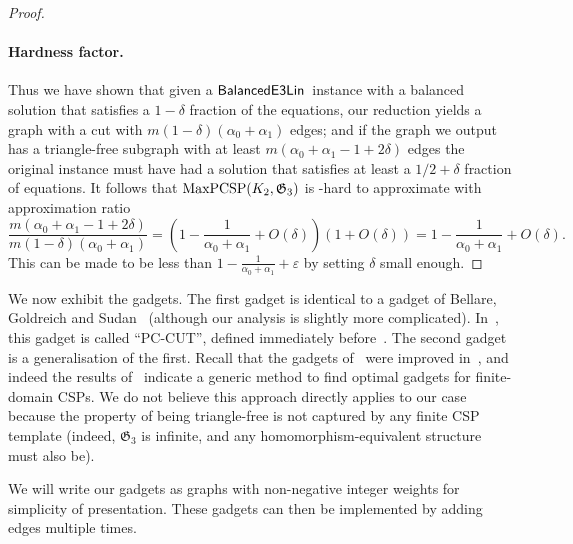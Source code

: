 \documentclass[a4paper,11pt, DIV=11]{scrartcl}
\renewcommand{\epsilon}{\varepsilon}
\renewcommand{\G}{\ensuremath{\mathfrak{G}}}
\DeclareMathOperator{\belin}{\textnormal{\textsf{BalancedE3Lin}}}
\DeclareMathOperator{\maxPCSP}{\textup{MaxPCSP}}
\theoremstyle{plain}
\theoremstyle{definition}
\begin{document}
\begin{proof}
    \paragraph{Hardness factor.} Thus we have shown that given a $\belin{}$ instance with a balanced solution that satisfies a $1 - \delta$ fraction of the equations, our reduction yields a graph with a cut with $m(1 - \delta)(\alpha_0 + \alpha_1)$ edges; and if the graph we output has a triangle-free subgraph with at least $m(\alpha_0 + \alpha_1 - 1 + 2\delta)$ edges the original instance must have had a solution that satisfies at least a $1 / 2 + \delta$ fraction of equations. It follows that $\maxPCSP(K_2, \G_3)$ is \NP-hard to approximate with approximation ratio
    \[
    \frac{m(\alpha_0 + \alpha_1 - 1 +  2\delta)}{m(1 - \delta)(\alpha_0 + \alpha_1)}
    =
    \left(1 - \frac{1}{\alpha_0 + \alpha_1} + O(\delta)\right)(1 + O(\delta))
    = 1 - \frac{1}{\alpha_0 + \alpha_1} + O(\delta).
    \]
    This can be made to be less than $1 - \frac{1}{\alpha_0 + \alpha_1} + \epsilon$ by setting $\delta$ small enough.
\end{proof}
 
We now exhibit the gadgets. The first gadget is identical to a gadget of Bellare, Goldreich and Sudan~\cite{BGS:98} (although our analysis is slightly more complicated). In~\cite{BGS:98}, this gadget is called ``PC-CUT'', defined immediately before~\cite[Claim~4.17]{BGS:98}. The second gadget is a generalisation of the first. Recall that the gadgets of~\cite{BGS:98} were improved in~\cite{Trevisan00:sicomp}, and indeed the results of~\cite{Trevisan00:sicomp} indicate a generic method to find optimal gadgets for finite-domain CSPs. We do not believe this approach directly applies to our case because the property of being triangle-free is not captured by any finite CSP template (indeed, $\G_3$ is infinite, and any homomorphism-equivalent structure must also be).

We will write our gadgets as graphs with non-negative integer weights for simplicity of presentation. These gadgets can then be implemented by adding edges multiple times.
\end{document}
